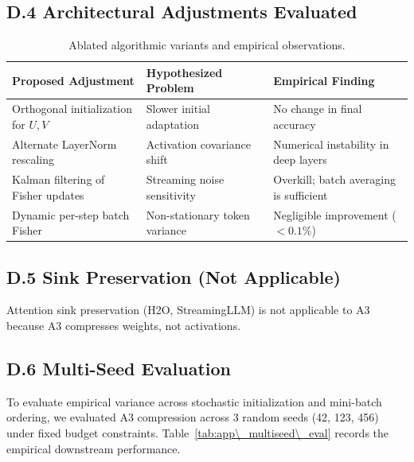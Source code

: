 \subsection{D.4 Architectural Adjustments Evaluated}

\begin{table}[H]
\centering
\small
\begin{tabular}{lll}
\toprule
\textbf{Proposed Adjustment} & \textbf{Hypothesized Problem} & \textbf{Empirical Finding} \\
\midrule
Orthogonal initialization for $U, V$ & Slower initial adaptation & No change in final accuracy \\
Alternate LayerNorm rescaling & Activation covariance shift & Numerical instability in deep layers \\
Kalman filtering of Fisher updates & Streaming noise sensitivity & Overkill; batch averaging is sufficient \\
Dynamic per-step batch Fisher & Non-stationary token variance & Negligible improvement ($<0.1\%$) \\
\bottomrule
\end{tabular}
\caption{Ablated algorithmic variants and empirical observations.}
\label{tab:negative\_variants}
\end{table}

\subsection{D.5 Sink Preservation (Not Applicable)}

Attention sink preservation (H2O, StreamingLLM) is not applicable to A3 
because A3 compresses weights, not activations.

\subsection{D.6 Multi-Seed Evaluation}
\label{sec:app\_multiseed}

To evaluate empirical variance across stochastic initialization and mini-batch ordering, we evaluated A3 compression across 3 random seeds (42, 123, 456) under fixed budget constraints. Table~\ref{tab:app\_multiseed\_eval} records the empirical downstream performance.

